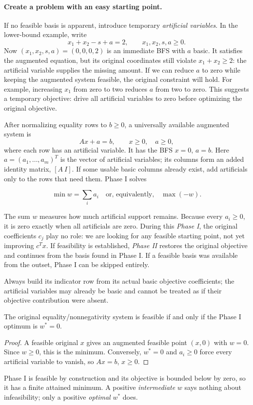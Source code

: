 \documentclass[11pt,a4paper]{article}
\begin{document}
\paragraph{Create a problem with an easy starting point.}
If no feasible basis is apparent, introduce temporary \emph{artificial
  variables}. In the lower-bound example, write
\[
  x_1+x_2-s+a=2,\qquad x_1,x_2,s,a\geq0.
\]
Now $(x_1,x_2,s,a)=(0,0,0,2)$ is an immediate BFS with $a$ basic.
It satisfies the augmented equation, but its original coordinates still
violate $x_1+x_2\geq2$: the artificial variable supplies the missing amount.
If we can reduce $a$ to zero while keeping the augmented system feasible,
the original constraint will hold. For example, increasing $x_1$ from zero
to two reduces $a$ from two to zero. This suggests a temporary objective:
drive all artificial variables to zero before optimizing the original objective.

After normalizing equality rows to $b\geq0$, a universally available augmented
system is
\[
  Ax+a=b,\qquad x\geq0,\quad a\geq0,
\]
where each row has an artificial variable. It has the BFS $x=0$, $a=b$.
Here $a=(a_1,\ldots,a_m)^T$ is the vector of artificial variables;
its columns form an added identity matrix, $[A\ I]$.
If some usable basic columns already exist, add artificials only to the rows
that need them. Phase I solves
\begin{lecturecore}
  \begin{equation}\label{eq:phase-one}
    \min w=\sum_i a_i\quad\text{or, equivalently,}\quad\max(-w).
  \end{equation}
\end{lecturecore}
The sum $w$ measures how much artificial support remains. Because every
$a_i\geq0$, it is zero exactly when all artificials are zero. During this
\emph{Phase I}, the original coefficients $c_j$ play no role: we are looking
for any feasible starting point, not yet improving $c^Tx$. If feasibility is
established, \emph{Phase II} restores the original objective and continues
from the basis found in Phase I. If a feasible basis was available from the
outset, Phase I can be skipped entirely.

Always build its indicator row from its actual basic objective coefficients;
the artificial variables may already be basic and cannot be treated as if their
objective contribution were absent.

\begin{proposition}
  The original equality/nonnegativity system is feasible if and only if the
  Phase I optimum is $w^*=0$.
\end{proposition}
\begin{proof}
  A feasible original $x$ gives an augmented feasible point $(x,0)$ with $w=0$.
  Since $w\geq0$, this is the minimum. Conversely, $w^*=0$ and $a_i\geq0$
  force every artificial variable to vanish, so $Ax=b$, $x\geq0$.
\end{proof}
Phase I is feasible by construction and its objective is bounded below by zero,
so it has a finite attained minimum. A positive \emph{intermediate} $w$ says
nothing about infeasibility; only a positive \emph{optimal} $w^*$ does.
\end{document}
